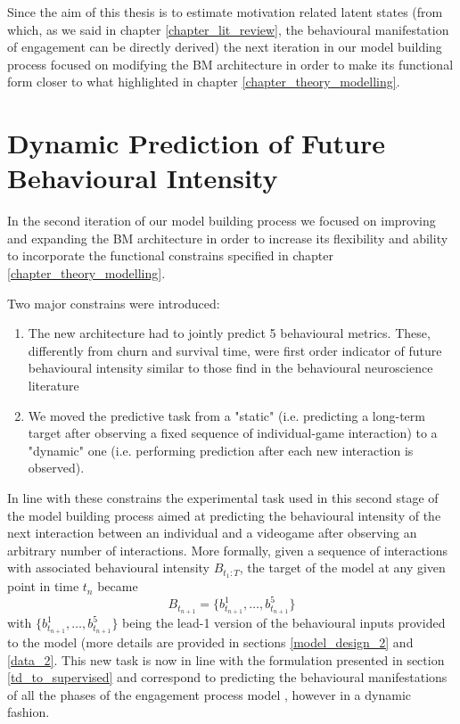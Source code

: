 Since the aim of this thesis is to estimate motivation related latent states (from which, as we said in chapter \ref{chapter_lit_review}, the behavioural manifestation of engagement can be directly derived) the next iteration in our model building process focused on modifying the BM architecture in order to make its functional form closer to what highlighted in chapter \ref{chapter_theory_modelling}.

\section{Dynamic Prediction of Future Behavioural Intensity}
\label{model_architecture_2}
In the second iteration of our model building process we focused on improving and expanding the BM architecture in order to increase its flexibility and ability to incorporate the functional constrains specified in chapter \ref{chapter_theory_modelling}. 

Two major constrains were introduced:
\begin{enumerate}
    \item The new architecture had to jointly predict 5 behavioural metrics. These, differently from churn and survival time, were first order indicator of future behavioural intensity similar to those find in the behavioural neuroscience literature \cite{schultz1997neural,mcclure2003computational,berridge2004motivation,zhang2009neural}
    
    \item We moved the predictive task from a "static" (i.e. predicting a long-term target after observing a fixed sequence of individual-game interaction) to a "dynamic" one (i.e. performing prediction after each new interaction is observed).
\end{enumerate}

In line with these constrains the experimental task used in this second stage of the model building process aimed at predicting the behavioural intensity of the next interaction between an individual and a videogame after observing an arbitrary number of interactions. More formally, given a sequence of interactions with associated behavioural intensity $B_{t_1 : T}$, the target of the model at any given point in time $t_n$ became
\begin{equation}
\label{joint_target_eq}
   B_{t_{n+1}} = \{b^1_{t_{n+1}}, \dots,  b^5_{t_{n+1}}\}
\end{equation}
with $\{b^1_{t_{n+1}}, \dots, b^5_{t_{n+1}}\}$ being the lead-1 version of the behavioural inputs provided to the model (more details are provided in sections \ref{model_design_2} and \ref{data_2}. This new task is now in line with the formulation presented in section \ref{td_to_supervised} and correspond to predicting the behavioural manifestations of all the phases of the engagement process model \cite{o2008user}, however in a dynamic fashion. 

